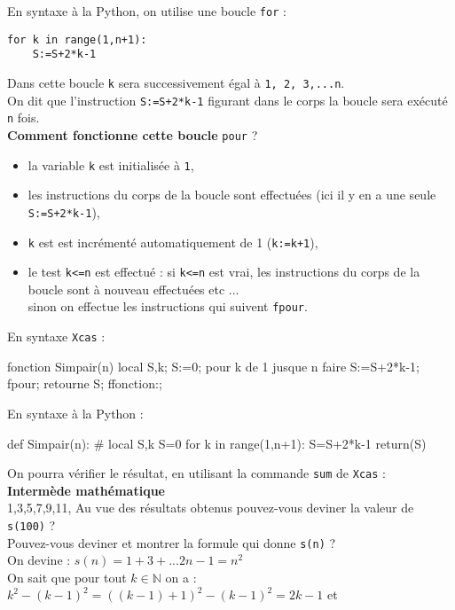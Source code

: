 \documentclass[12pt,a4paper]{book}
\begin{document}
\begin{giacjshere}
En syntaxe \`a la Python, on utilise une boucle {\tt for} :
\begin{verbatim}
for k in range(1,n+1): 
    S:=S+2*k-1
\end{verbatim}
Dans cette boucle {\tt k} sera successivement \'egal \`a {\tt 1, 2, 3,...n}.\\
On dit que l'instruction {\tt S:=S+2*k-1} figurant dans le corps la  boucle 
sera ex\'ecut\'e {\tt n} fois.\\
{\bf Comment fonctionne cette boucle} {\tt pour} ?
\begin{itemize}
\item la variable {\tt k} est initialis\'ee \`a {\tt 1},
\item les instructions du corps de la boucle sont effectu\'ees 
(ici il y en a une seule {\tt S:=S+2*k-1}),
\item {\tt k} est est incr\'ement\'e  automatiquement de 1 ({\tt k:=k+1}),
\item le test {\tt k<=n} est effectu\'e :
si {\tt k<=n} est vrai,  les instructions du corps de la boucle sont \`a 
nouveau effectu\'ees etc ... \\
sinon on effectue les instructions qui suivent {\tt fpour}.
\end{itemize}
En syntaxe {\tt Xcas} :
\begin{giaconload}
fonction Simpair(n) 
 local S,k;
 S:=0; 
 pour k de 1 jusque n faire 
   S:=S+2*k-1; 
 fpour;
 retourne S; 
ffonction:;
\end{giaconload}
En syntaxe \`a la Python :
\begin{giacprog}
def Simpair(n):
    # local S,k
    S=0
    for k in range(1,n+1):
       S=S+2*k-1 
    return(S)
\end{giacprog}
On  pourra v\'erifier le r\'esultat, en utilisant la commande  {\tt sum} de
 {\tt Xcas} :\\
{\bf Interm\`ede math\'ematique}\\1,3,5,7,9,11,
Au vue des r\'esultats obtenus pouvez-vous deviner la valeur de 
{\tt s(100)} ?\\
Pouvez-vous deviner et montrer la formule qui donne {\tt s(n)} ?\\
On devine : $s(n)=1+3+...2n-1=n^2$\\
On sait que pour tout $k \in \mathbb{N}$ on a :\\
$k^2-(k-1)^2=((k-1)+1)^2-(k-1)^2=2k-1$ et\\

\end{giacjshere}
\end{document}
